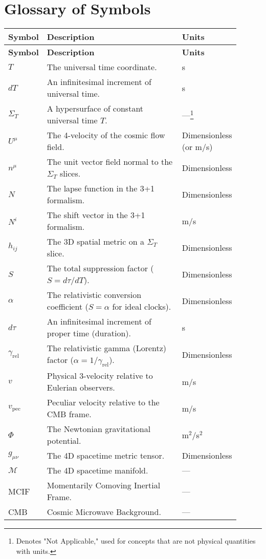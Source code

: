 \documentclass[12pt]{article}
\theoremstyle{plain}
\newcommand{\gammarel}{\gamma_{\!\mathrm{rel}}}
\begin{document}
\section{Glossary of Symbols}
\vspace{-1.0em}
\begin{longtable}{p{0.15\linewidth} p{0.6\linewidth} p{0.15\linewidth}}
    \toprule
    \textbf{Symbol} & \textbf{Description} & \textbf{Units} \\
    \midrule
    \endfirsthead
    \toprule
    \textbf{Symbol} & \textbf{Description} & \textbf{Units} \\
    \midrule
    $T$ & The universal time coordinate. & s \\
    $dT$ & An infinitesimal increment of universal time. & s \\
    $\Sigma_T$ & A hypersurface of constant universal time $T$. & ---\footnote{Denotes "Not Applicable," used for concepts that are not physical quantities with units.} \\
    $U^\mu$ & The 4-velocity of the cosmic flow field. & Dimensionless (or m/s) \\
    $n^\mu$ & The unit vector field normal to the $\Sigma_T$ slices. & Dimensionless \\
    $N$ & The lapse function in the 3+1 formalism. & Dimensionless \\
    $N^i$ & The shift vector in the 3+1 formalism. & m/s \\
    $h_{ij}$ & The 3D spatial metric on a $\Sigma_T$ slice. & Dimensionless \\
    $S$ & The total suppression factor ($S = d\tau/dT$). & Dimensionless \\
    $\alpha$ & The relativistic conversion coefficient ($S=\alpha$ for ideal clocks). & Dimensionless \\
    $d\tau$ & An infinitesimal increment of proper time (duration). & s \\
    $\gammarel$ & The relativistic gamma (Lorentz) factor ($\alpha = 1/\gammarel$). & Dimensionless \\
    $v$ & Physical 3-velocity relative to Eulerian observers. & m/s \\
    $v_{\mathrm{pec}}$ & Peculiar velocity relative to the CMB frame. & m/s \\
    $\Phi$ & The Newtonian gravitational potential. & m$^2$/s$^2$ \\
    $g_{\mu\nu}$ & The 4D spacetime metric tensor. & Dimensionless \\
    $\mathcal{M}$ & The 4D spacetime manifold. & --- \\
    MCIF & Momentarily Comoving Inertial Frame. & --- \\
    CMB & Cosmic Microwave Background. & --- \\
    \bottomrule
\end{longtable}
\end{document}
